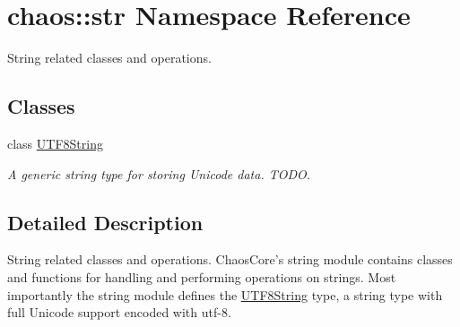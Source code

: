 \hypertarget{namespacechaos_1_1str}{\section{chaos\-:\-:str Namespace Reference}
\label{namespacechaos_1_1str}
}


String related classes and operations.  


\subsection*{Classes}
\begin{DoxyCompactItemize}
\item 
class \hyperlink{classchaos_1_1str_1_1_u_t_f8_string}{U\-T\-F8\-String}
\begin{DoxyCompactList}\small\item\em A generic string type for storing Unicode data. T\-O\-D\-O. \end{DoxyCompactList}\end{DoxyCompactItemize}


\subsection{Detailed Description}
String related classes and operations. Chaos\-Core's string module contains classes and functions for handling and performing operations on strings. Most importantly the string module defines the \hyperlink{classchaos_1_1str_1_1_u_t_f8_string}{U\-T\-F8\-String} type, a string type with full Unicode support encoded with utf-\/8. 